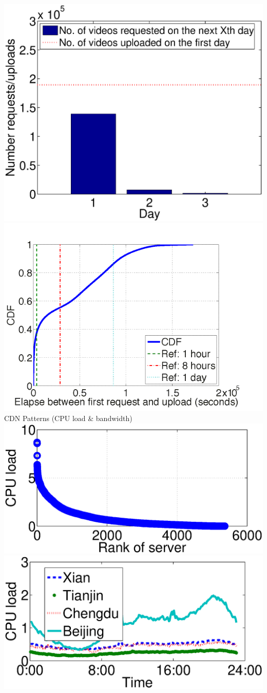 \documentclass[landscape,final,a0paper,fontscale=0.285]{baposter}
\begin{document}
\begin{poster}
{		%
		\includegraphics[width=.46\linewidth]{fig/view-in-3-days.eps}
		\includegraphics[width=.53\linewidth]{fig/updowntimediff.png}\\
	CDN Patterns (CPU load \& bandwidth)\\
		\includegraphics[width=0.48\linewidth]{fig/cpuload_vs_server.eps}
		\includegraphics[width=0.48\linewidth]{fig/idc_cpuload_over_time.eps}
}
\end{poster}
\end{document}
